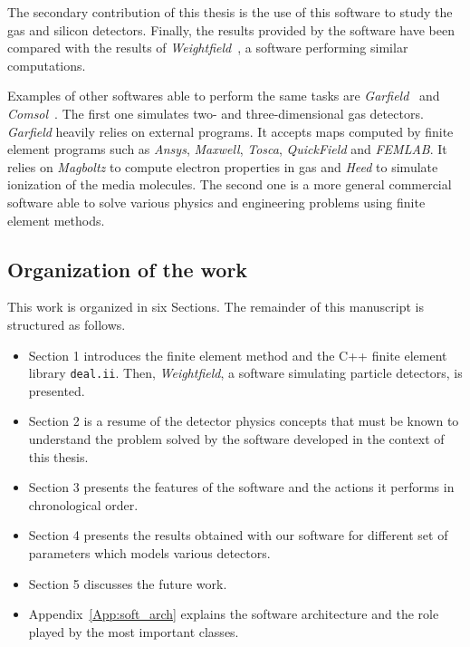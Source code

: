 \documentclass[11pt]{article}
\begin{document}
		The secondary contribution of this thesis is the use of this software to study
		the gas and silicon detectors. Finally, the results provided by the
		software have been compared with the results of \textit{Weightfield}~\cite{Cenna2015}, a
		software performing similar computations.

		Examples of other softwares able to perform the same tasks are
		\textit{Garfield}~\cite{garfield}	and \textit{Comsol}~\cite{comsol}.
		The first one simulates two- and three-dimensional gas detectors.
		\textit{Garfield} heavily relies on external programs.
		It accepts maps computed by finite element programs such as \textit{Ansys},
		\textit{Maxwell}, \textit{Tosca}, \textit{QuickField} and \textit{FEMLAB}.
		It relies on \textit{Magboltz} to compute electron properties in gas and
		\textit{Heed} to simulate ionization of the media molecules.
		The second one is a more general commercial software able to solve various physics and
		engineering problems using finite element methods.


	\subsection*{Organization of the work}

		This work is organized in six Sections. The remainder of this manuscript
		is structured as follows.

		\begin{itemize}
			\item Section 1 introduces the finite element method and the
			C++ finite element library \texttt{deal.ii}. Then, \textit{Weightfield},
			a software simulating particle detectors, is presented.
			\item Section 2 is a resume of the detector physics concepts that must be
			known to understand the problem solved by the software developed in the
			context of this thesis.
			\item Section 3 presents the features of the software and the actions
			it performs in chronological order.

			\item Section 4 presents the results obtained with our software for
			different set of parameters which models various detectors.
			\item Section 5 discusses the future work.

			\item Appendix~\ref{App:soft_arch} explains the software architecture and the role played by
			the most important classes.
		\end{itemize}
\end{document}
